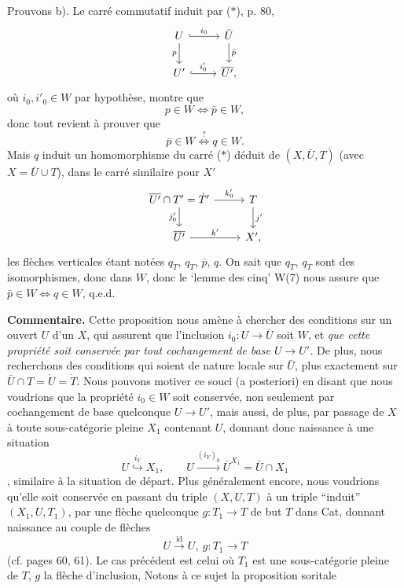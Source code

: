 \documentclass[11pt]{article}
\newcommand{\printedpage}[1]{\marginpar{\footnotesize p.~#1}}
\newcommand{\msp}[1]{\marginpar{\footnotesize [#1]}}
\begin{document}
Prouvons b). Le carré commutatif induit par ($*$), p. 80,
\printedpage{60}
\[
\begin{tikzcd}
U \arrow[r, hook, "i_0"] \arrow[d, "p"'] & \bar U \arrow[d, "\bar p"] \\
U' \arrow[r, hook, "i'_0"] & \overline{U'},
\end{tikzcd}
\]
où $i_0,i'_0\in W$ par hypothèse, montre que
\[
p\in W\iff\bar p\in W,
\]
donc tout revient à prouver que
\[
\bar p\in W\overset{?}{\iff}q\in W.
\]
Mais $q$ induit un homomorphisme du carré ($*$) déduit de $(X,\bar U,T)$ (avec $X=\bar U\cup T$), dans le carré similaire pour $X'$
\[
\begin{tikzcd}
\overline{U'}\cap T'=\dot T' \arrow[r, "k'_0"] \arrow[d, "j'_0"'] & T \arrow[d, "j'"] \\ %
\overline{U'} \arrow[r, "k'"] & X',
\end{tikzcd}
\]
les flèches verticales étant notées $q_{\dot T}$, $q_T$, $\bar p$, $q$.
\msp{page 83}
On sait que $q_{\dot T}$, $q_T$ sont des isomorphismes, donc dans $W$, donc le ‘lemme des cinq’ W(7) nous assure que $\bar p\in W\iff q\in W$, q.e.d.

\textbf{Commentaire.} Cette proposition nous amène à chercher des conditions sur un ouvert $U$ d’un $X$, qui assurent que l’inclusion $i_0:U\longrightarrow\bar U$ soit $W$, et \textit{que cette propriété soit conservée par tout cochangement de base $U\longrightarrow U'$.} De plus, nous recherchons des conditions qui soient de nature locale sur $\bar U$, plus exactement sur $\bar U\cap T=\dot U=\dot T$. Nous pouvons motiver ce souci (a posteriori) en disant que nous voudrions que la propriété $i_0\in W$ soit conservée, non seulement par cochangement de base quelconque $U\longrightarrow U'$, mais aussi, de plus, par passage de $X$ à toute sous-catégorie pleine $X_1$ contenant $U$, donnant donc naissance à une situation
\[
U\overset{i_Y}{\hookrightarrow}X_1,\qquad U\xrightarrow{(i_Y)_0}\bar U^{X_1}=\bar U\cap X_1
\]
, similaire à la situation de départ. Plus généralement encore, nous voudrions qu’elle soit conservée en passant du triple $(X,U,T)$ à un triple “induit” $(X_1,U,T_1)$, par une flèche quelconque $g:T_1\longrightarrow T$ de but $T$ dans Cat, donnant naissance au couple de flèches
\[
U\xrightarrow{\mathrm{id}}U,\ g:T_1\longrightarrow T
\]
(cf. pages 60, 61). Le cas précédent est celui où
\printedpage{61}
\msp{page 84}
$T_1$ est une sous-catégorie pleine de $T$, $g$ la flèche d’inclusion, Notons à ce sujet la proposition soritale %
\end{document}
